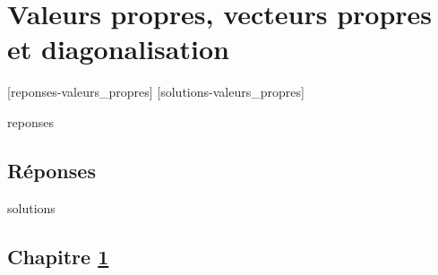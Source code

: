 \chapter{Valeurs propres, vecteurs propres et diagonalisation}
\label{chap:valeurspropres}


[reponses-valeurs_propres]
[solutions-valeurs_propres]

\begin{Filesave}{reponses}
\bigskip
\section*{Réponses}

\end{Filesave}

\begin{Filesave}{solutions}
\section*{Chapitre \ref{chap:valeurspropres}}

\end{Filesave}



